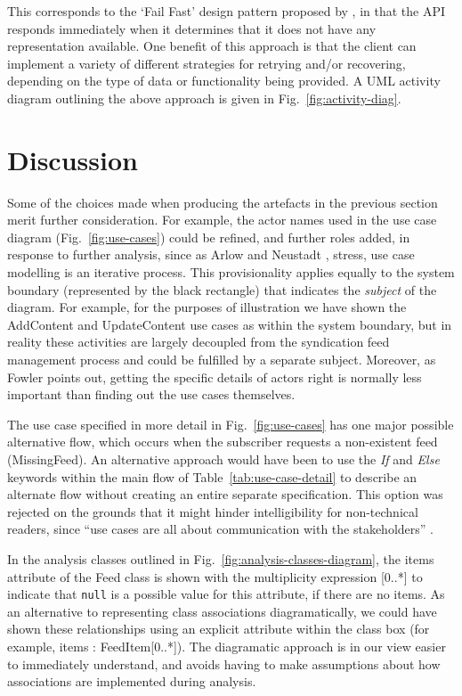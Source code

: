 \documentclass[runningheads,a4paper]{llncs}
\begin{document}
This corresponds to the `Fail Fast' design pattern proposed by \cite{nygard}, in that the API responds immediately when it determines that it does not have any representation available. One benefit of this approach is that the client can implement a variety of different strategies for retrying and/or recovering, depending on the type of data or functionality being provided. A UML activity diagram outlining the above approach is given in Fig.~\ref{fig:activity-diag}.


\section{Discussion}

Some of the choices made when producing the artefacts in the previous section merit further consideration. For example, the actor names used in the use case diagram (Fig.~\ref{fig:use-cases}) could be refined, and further roles added, in response to further analysis, since as Arlow and Neustadt \cite{arlow}, stress, use case modelling is an iterative process. This provisionality applies equally to the system boundary (represented by the black rectangle) that indicates the \textit{subject} of the diagram. For example, for the purposes of illustration we have shown the \textsf{AddContent} and \textsf{UpdateContent} use cases as within the system boundary, but in reality these activities are largely decoupled from the syndication feed management process and could be fulfilled by a separate subject. Moreover, as Fowler \cite{fowler2000} points out, getting the specific details of actors right is normally less important than finding out the use cases themselves.

The use case specified in more detail in Fig.~\ref{fig:use-cases} has one major possible alternative flow, which occurs when the subscriber requests a non-existent feed (\textsf{MissingFeed}). An alternative approach would have been to use the \textit{If} and \textit{Else} keywords within the main flow of Table~\ref{tab:use-case-detail} to describe an alternate flow without creating an entire separate specification. This option was rejected on the grounds that it might hinder intelligibility for non-technical readers, since ``use cases are all about communication with the stakeholders'' \cite{arlow}.

In the analysis classes outlined in Fig.~\ref{fig:analysis-classes-diagram}, the \textsf{items} attribute of the \textsf{Feed} class is shown with the multiplicity expression \textsf{[0..*]} to indicate that \texttt{null} is a possible value for this attribute, if there are no items. As an alternative to representing class associations diagramatically, we could have shown these relationships using an explicit attribute within the class box (for example, \textsf{items : FeedItem[0..*]}). The diagramatic approach is in our view easier to immediately understand, and avoids having to make assumptions about how associations are implemented during analysis.
\end{document}
